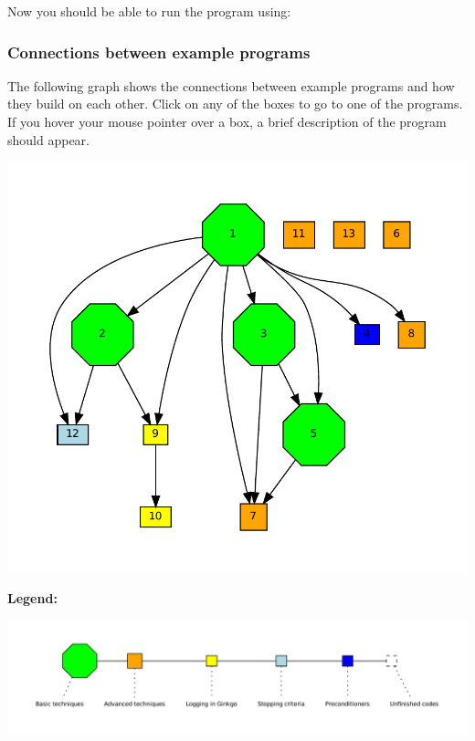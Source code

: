 Now you should be able to run the program using\+:




\label{_graph}%
 \label{Examples_ExampleConnectionGraph}%
%
 \subsubsection*{Connections between example programs}

The following graph shows the connections between example programs and how they build on each other. Click on any of the boxes to go to one of the programs. If you hover your mouse pointer over a box, a brief description of the program should appear. 
\begin{DoxyImageNoCaption}
  \mbox{\includegraphics[width=\textwidth,height=\textheight/2,keepaspectratio=true]{dot_inline_dotgraph_1}}
\end{DoxyImageNoCaption}


{\bfseries Legend\+:}~\newline
 
\begin{DoxyImageNoCaption}
  \mbox{\includegraphics[width=\textwidth,height=\textheight/2,keepaspectratio=true]{dot_inline_dotgraph_2}}
\end{DoxyImageNoCaption}


